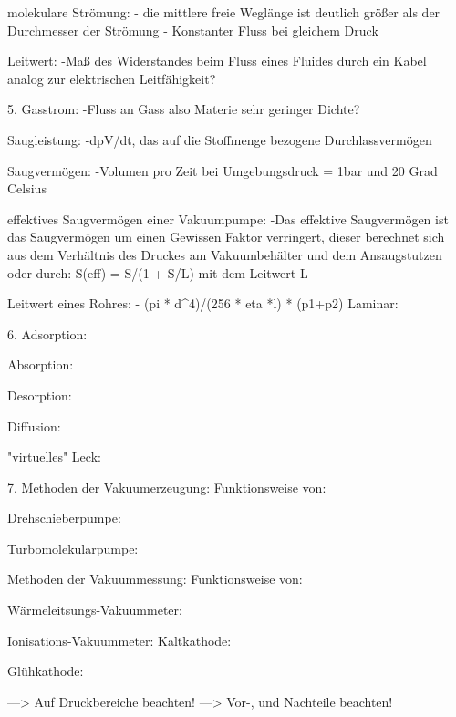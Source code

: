 	   molekulare Strömung:
		- die mittlere freie Weglänge ist deutlich größer als der Durchmesser der Strömung
		- Konstanter Fluss bei gleichem Druck

	   Leitwert:
		-Maß des Widerstandes beim Fluss eines Fluides durch ein Kabel analog zur elektrischen Leitfähigkeit? 

	5. Gasstrom: 
		-Fluss an Gass also Materie sehr geringer Dichte?

	   Saugleistung:
		-dpV/dt, das auf die Stoffmenge bezogene Durchlassvermögen

	   Saugvermögen:
	   	-Volumen pro Zeit bei Umgebungsdruck = 1bar und 20 Grad Celsius

	   effektives Saugvermögen einer Vakuumpumpe:
	   	-Das effektive Saugvermögen ist das Saugvermögen um einen Gewissen Faktor verringert, dieser berechnet sich aus dem Verhältnis des Druckes am Vakuumbehälter und dem Ansaugstutzen oder durch:
			S(eff) = S/(1 + S/L) mit dem Leitwert L

	   Leitwert eines Rohres:
		- (pi * d^4)/(256 * eta *l) * (p1+p2) Laminar: 

	6. Adsorption:

	   Absorption:

	   Desorption:

	   Diffusion:

	   "virtuelles" Leck:

	7. Methoden der Vakuumerzeugung:
		Funktionsweise von:

		Drehschieberpumpe:

		Turbomolekularpumpe:

	   Methoden der Vakuummessung:
	   	Funktionsweise von:

		Wärmeleitsungs-Vakuummeter:

		Ionisations-Vakuummeter:
			Kaltkathode:

			Glühkathode:


	---> Auf Druckbereiche beachten!
	---> Vor-, und Nachteile beachten!


